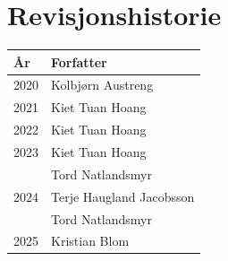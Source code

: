 \section*{Revisjonshistorie}
\begin{center}
 \begin{tabular}{|p{2.5cm} p{5.5cm}|} 
 \hline
 År & Forfatter \\ [0.5ex] 
 \hline\hline
 2020 & Kolbjørn Austreng\\
 \hline
 2021 & Kiet Tuan Hoang\\
 \hline
 2022 & Kiet Tuan Hoang \\ 
 \hline
 2023 & Kiet Tuan Hoang \\
      & Tord Natlandsmyr \\
 \hline
 2024 & Terje Haugland Jacobsson \\
      & Tord Natlandsmyr \\
 \hline
 2025 & Kristian Blom \\
 \hline
\end{tabular}
\end{center}

